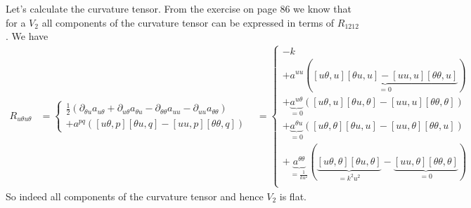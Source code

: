 Let's calculate the curvature tensor. From the exercise on page 86 we know that for a $V_2$ all components of the curvature tensor can be expressed in terms of $R_{1212}$. We have
\begin{align}
R_{u\theta u\theta} &= \left \{ \begin{array}{l}
\frac{1}{2}\left(\partial_{\theta u}a_{u \theta}+\partial_{u \theta}a_{\theta u}-\partial_{\theta \theta}a_{uu}-\partial_{u u}a_{\theta \theta}  \right) \\
 + a^{pq}\left([u \theta,p][\theta u,q] -[u u,p][\theta \theta,q]  \right)
\end{array} \right.
&= \left \{ \begin{array}{l}
-k \\
 + a^{uu}\left(\underbrace{[u \theta,u][\theta u,u] -[u u,u][\theta \theta,u]}_{=0}  \right)\\
 + \underbrace{a^{u \theta}}_{=0}\left([u \theta,u][\theta u,\theta] -[u u,u][\theta \theta,\theta]  \right)\\
 + \underbrace{a^{\theta u}}_{=0}\left([u \theta,\theta][\theta u,u] -[u u,\theta][\theta \theta,u]  \right)\\
 + \underbrace{a^{\theta \theta}}_{=\frac{1}{ku^2}}\left(\underbrace{[u \theta,\theta][\theta u,\theta]}_{= k^2u^2} -\underbrace{[u u,\theta][\theta \theta,\theta]}_{=0}  \right)\\
\end{array} \right.
\end{align}
So indeed all components of the curvature tensor and hence $V_2$ is flat.

